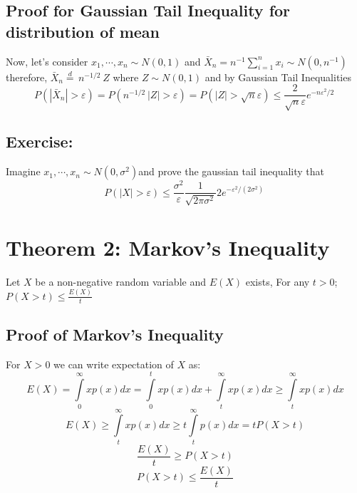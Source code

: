 \documentclass[
]{article}
\begin{document}
\hypertarget{proof-for-gaussian-tail-inequality-for-distribution-of-mean}{%
\subsection{Proof for Gaussian Tail Inequality for distribution of
mean}\label{proof-for-gaussian-tail-inequality-for-distribution-of-mean}}

Now, let's consider
\({{x}_{1}},\cdots ,{{x}_{n}}\sim N\left( 0,1 \right)\) and
\({{\bar{X}}_{n}}={{n}^{-1}}\sum\limits_{i=1}^{n}{{{x}_{i}}}\sim N\left( 0,{{n}^{-1}} \right)\)
therefore,
\({{\bar{X}}_{n}}\overset{d}{\mathop{=}}\,{{n}^{-{1}/{2}\;}}Z\) where
\(Z\sim N\left( 0,1 \right)\) and by Gaussian Tail Inequalities
\[P\left( \left| {{{\bar{X}}}_{n}} \right|>\varepsilon  \right)=P\left( {{n}^{-{1}/{2}\;}}\left| Z \right|>\varepsilon  \right)=P\left( \left| Z \right|>\sqrt{n}\varepsilon  \right)\le \frac{2}{\sqrt{n}\varepsilon }{{e}^{-{n{{\varepsilon }^{2}}}/{2}\;}}\]

\hypertarget{exercise}{%
\subsection{Exercise:}\label{exercise}}

Imagine
\({{x}_{1}},\cdots ,{{x}_{n}}\sim N\left( 0,{{\sigma }^{2}} \right)\)and
prove the gaussian tail inequality that
\[P\left( \left| X \right|>\varepsilon  \right)\le \frac{{{\sigma }^{2}}}{\varepsilon }\frac{1}{\sqrt{2\pi {{\sigma }^{2}}}}2{{e}^{-{{{\varepsilon }^{2}}}/{\left( 2{{\sigma }^{2}} \right)}\;}}\]

\hypertarget{theorem-2-markovs-inequality}{%
\section{Theorem 2: Markov's
Inequality}\label{theorem-2-markovs-inequality}}

Let \(X\) be a non-negative random variable and \(E\left( X \right)\)
exists, For any \(t>0\);
\(P\left( X>t \right)\le \frac{E\left( X \right)}{t}\)

\hypertarget{proof-of-markovs-inequality}{%
\subsection{Proof of Markov's
Inequality}\label{proof-of-markovs-inequality}}

For \(X>0\) we can write expectation of \(X\) as:
\[E\left( X \right)=\int\limits_{0}^{\infty }{xp\left( x \right)dx}=\int\limits_{0}^{t}{xp\left( x \right)dx}+\int\limits_{t}^{\infty }{xp\left( x \right)dx}\ge \int\limits_{t}^{\infty }{xp\left( x \right)dx}\]
\[E\left( X \right)\ge \int\limits_{t}^{\infty }{xp\left( x \right)dx}\ge t\int\limits_{t}^{\infty }{p\left( x \right)dx}=tP\left( X>t \right)\]
\[\frac{E\left( X \right)}{t}\ge P\left( X>t \right)\]
\[P\left( X>t \right)\le \frac{E\left( X \right)}{t}\]
\end{document}
